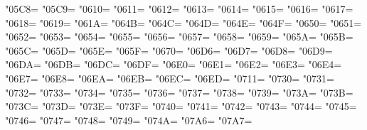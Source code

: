 \XeTeXcharclass"05C8=\KclassCM
\XeTeXcharclass"05C9=\KclassCM
\XeTeXcharclass"0610=\KclassCM
\XeTeXcharclass"0611=\KclassCM
\XeTeXcharclass"0612=\KclassCM
\XeTeXcharclass"0613=\KclassCM
\XeTeXcharclass"0614=\KclassCM
\XeTeXcharclass"0615=\KclassCM
\XeTeXcharclass"0616=\KclassCM
\XeTeXcharclass"0617=\KclassCM
\XeTeXcharclass"0618=\KclassCM
\XeTeXcharclass"0619=\KclassCM
\XeTeXcharclass"061A=\KclassCM
\XeTeXcharclass"064B=\KclassCM
\XeTeXcharclass"064C=\KclassCM
\XeTeXcharclass"064D=\KclassCM
\XeTeXcharclass"064E=\KclassCM
\XeTeXcharclass"064F=\KclassCM
\XeTeXcharclass"0650=\KclassCM
\XeTeXcharclass"0651=\KclassCM
\XeTeXcharclass"0652=\KclassCM
\XeTeXcharclass"0653=\KclassCM
\XeTeXcharclass"0654=\KclassCM
\XeTeXcharclass"0655=\KclassCM
\XeTeXcharclass"0656=\KclassCM
\XeTeXcharclass"0657=\KclassCM
\XeTeXcharclass"0658=\KclassCM
\XeTeXcharclass"0659=\KclassCM
\XeTeXcharclass"065A=\KclassCM
\XeTeXcharclass"065B=\KclassCM
\XeTeXcharclass"065C=\KclassCM
\XeTeXcharclass"065D=\KclassCM
\XeTeXcharclass"065E=\KclassCM
\XeTeXcharclass"065F=\KclassCM
\XeTeXcharclass"0670=\KclassCM
\XeTeXcharclass"06D6=\KclassCM
\XeTeXcharclass"06D7=\KclassCM
\XeTeXcharclass"06D8=\KclassCM
\XeTeXcharclass"06D9=\KclassCM
\XeTeXcharclass"06DA=\KclassCM
\XeTeXcharclass"06DB=\KclassCM
\XeTeXcharclass"06DC=\KclassCM
\XeTeXcharclass"06DF=\KclassCM
\XeTeXcharclass"06E0=\KclassCM
\XeTeXcharclass"06E1=\KclassCM
\XeTeXcharclass"06E2=\KclassCM
\XeTeXcharclass"06E3=\KclassCM
\XeTeXcharclass"06E4=\KclassCM
\XeTeXcharclass"06E7=\KclassCM
\XeTeXcharclass"06E8=\KclassCM
\XeTeXcharclass"06EA=\KclassCM
\XeTeXcharclass"06EB=\KclassCM
\XeTeXcharclass"06EC=\KclassCM
\XeTeXcharclass"06ED=\KclassCM
\XeTeXcharclass"0711=\KclassCM
\XeTeXcharclass"0730=\KclassCM
\XeTeXcharclass"0731=\KclassCM
\XeTeXcharclass"0732=\KclassCM
\XeTeXcharclass"0733=\KclassCM
\XeTeXcharclass"0734=\KclassCM
\XeTeXcharclass"0735=\KclassCM
\XeTeXcharclass"0736=\KclassCM
\XeTeXcharclass"0737=\KclassCM
\XeTeXcharclass"0738=\KclassCM
\XeTeXcharclass"0739=\KclassCM
\XeTeXcharclass"073A=\KclassCM
\XeTeXcharclass"073B=\KclassCM
\XeTeXcharclass"073C=\KclassCM
\XeTeXcharclass"073D=\KclassCM
\XeTeXcharclass"073E=\KclassCM
\XeTeXcharclass"073F=\KclassCM
\XeTeXcharclass"0740=\KclassCM
\XeTeXcharclass"0741=\KclassCM
\XeTeXcharclass"0742=\KclassCM
\XeTeXcharclass"0743=\KclassCM
\XeTeXcharclass"0744=\KclassCM
\XeTeXcharclass"0745=\KclassCM
\XeTeXcharclass"0746=\KclassCM
\XeTeXcharclass"0747=\KclassCM
\XeTeXcharclass"0748=\KclassCM
\XeTeXcharclass"0749=\KclassCM
\XeTeXcharclass"074A=\KclassCM
\XeTeXcharclass"07A6=\KclassCM
\XeTeXcharclass"07A7=\KclassCM
